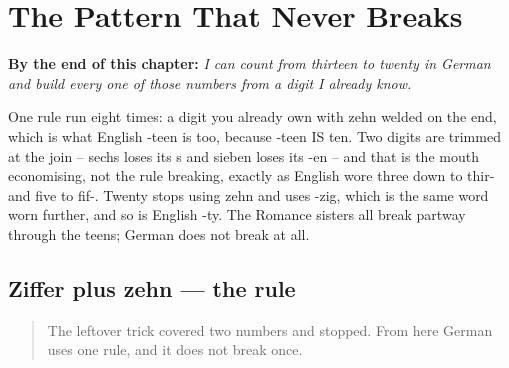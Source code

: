 
\chapter{The Pattern That Never Breaks}
\label{ch:zahlen-13-20}

\begin{chapteropening}
\textbf{By the end of this chapter:} \emph{I can count from thirteen to twenty in German and build every one of those numbers from a digit I already know.}

One rule run eight times: a digit you already own with zehn welded on the end, which is what English -teen is too, because -teen IS ten. Two digits are trimmed at the join -- sechs loses its s and sieben loses its -en -- and that is the mouth economising, not the rule breaking, exactly as English wore three down to thir- and five to fif-. Twenty stops using zehn and uses -zig, which is the same word worn further, and so is English -ty. The Romance sisters all break partway through the teens; German does not break at all.
\end{chapteropening}

\section[Ziffer plus zehn]{Ziffer plus zehn — the rule}

\label{lesson:GE-C12-ziffer-plus-zehn}



\begin{quote}
The leftover trick covered two numbers and stopped. From here German uses one rule, and it does not break once.
\end{quote}

